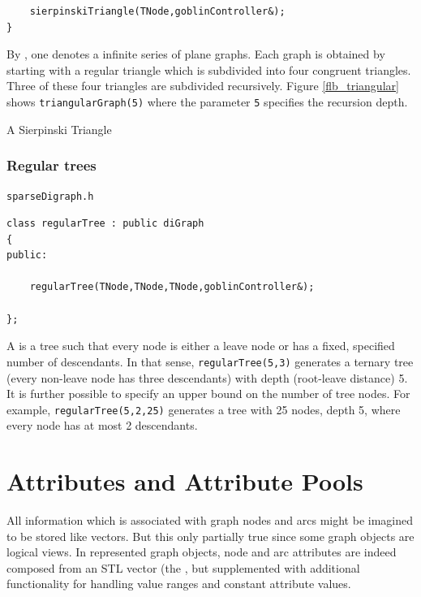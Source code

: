 \documentclass[a4paper,11pt,twoside]{book}
\begin{document}
\begin{multicols}{2}
\begin{mymethods}
\begin{verbatim}
    sierpinskiTriangle(TNode,goblinController&);
}
\end{verbatim}
\end{mymethods}
By , one denotes a infinite series of plane graphs.
Each graph is obtained by starting with a regular triangle which is subdivided
into four congruent triangles. Three of these four triangles are subdivided
recursively. Figure \ref{flb_triangular} shows \verb/triangularGraph(5)/ where
the parameter \verb/5/ specifies the recursion depth. 

\bigskip
\begin{figurehere}
\begin{center}
\epsfxsize=7cm
\vspace{0.5cm}
\caption{\label{flb_sierpinski}A Sierpinski Triangle}
\end{center}
\end{figurehere}



\subsection{Regular trees}
\myinclude\verb/sparseDigraph.h/
\begin{mymethods}
\begin{verbatim}
class regularTree : public diGraph
{
public:

    regularTree(TNode,TNode,TNode,goblinController&);

};
\end{verbatim}
\end{mymethods}
A  is a tree such that every node is either a leave node
or has a fixed, specified number of descendants. In that sense,
\verb/regularTree(5,3)/ generates a ternary tree (every non-leave node has
three descendants) with depth (root-leave distance) 5. It is further
possible to specify an upper bound on the number of tree nodes. For example,
\verb/regularTree(5,2,25)/ generates a tree with 25 nodes, depth 5, where
every node has at most 2 descendants.



\cleardoublepage
{}
\chapter{Attributes and Attribute Pools}
\thispagestyle{fancy}
\label{clb_attributes}
All information which is associated with graph nodes and arcs might be imagined
to be stored like vectors. But this only partially true since some graph objects
are logical views. In represented graph objects, node and arc attributes
are indeed composed from an STL vector (the ,
but supplemented with additional functionality for handling value ranges and
constant attribute values.


\end{multicols}
\end{document}

